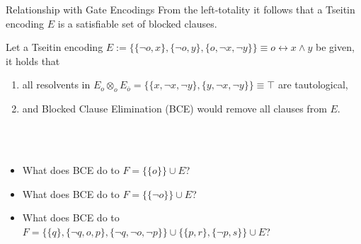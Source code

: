 \documentclass[t]{sdqbeamer}
\begin{document}
\begin{frame}{Relationship with Gate Encodings}
From the left-totality it follows that a Tseitin encoding $E$ is a satisfiable set of blocked clauses.\\[1em]
\begin{example}
Let a Tseitin encoding $E := \bigl\{\{ \lnot o, x \}, \{ \lnot o, y \}, \{ o, \lnot x, \lnot y \} \bigr\} \equiv o \leftrightarrow x \land y$ be given, it holds that\\[1em]
\begin{enumerate}\setlength{\itemsep}{1ex}
\item all resolvents in $E_o \otimes_o E_{\overline o} = \bigl\{ \{ x, \lnot x, \lnot y \}, \{ y, \lnot x, \lnot y \} \bigr\} \equiv \top$ are tautological,
\item and Blocked Clause Elimination (BCE) would remove all clauses from $E$.\\[1ex]
\end{enumerate}
\end{example}~\\[-1ex]
\\[1ex]
\begin{itemize}\setlength{\itemsep}{1ex}
\item What does BCE do to $F = \bigl\{ \{ o \} \bigr\} \cup E$?
\item What does BCE do to $F = \bigl\{ \{ \lnot o \} \bigr\} \cup E$?
\item What does BCE do to $F = \bigl\{ \{ q \}, \{ \lnot q, o, p \}, \{ \lnot q, \lnot o, \lnot p \} \bigr\} \cup \bigl\{ \{ p, r \}, \{ \lnot p, s \} \bigr\} \cup E$?
\end{itemize}
\end{frame}
\end{document}
